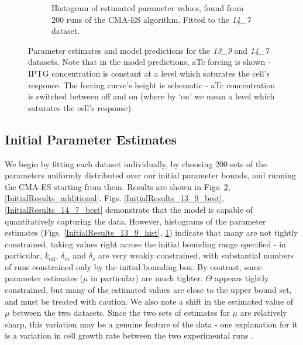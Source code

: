 \documentclass[10pt,journal]{./IEEE_latex_class/IEEEtran}
\begin{document}
\begin{figure}
\begin{subfigure}[c]{0.49\textwidth}
        \caption{Histogram of estimated parameter values, found from 200 runs of the CMA-ES algorithm. Fitted to the \textit{14\_7} dataset. }
        \label{InitialResults_14_7_hist}
    \end{subfigure}
    \caption{Parameter estimates and model predictions for the \textit{13\_9} and \textit{14\_7} datasets. Note that in the model predictions, aTc forcing is shown - IPTG concentration is constant at a level which saturates the cell's response. The forcing curve's height is schematic - aTc concentration is switched between off and on (where by `on' we mean a level which saturates the cell's response).}
\label{InitialResults}
\end{figure} 
 


\subsection{Initial Parameter Estimates}
\label{Initial Parameter Estimates}


 We begin by fitting each dataset individually, by choosing 200 sets of the parameters uniformly distributed over our initial parameter bounds, and running the CMA-ES starting from them. Results are shown in Figs. \ref{InitialResults}, \ref{InitialResults_additional}. Figs. \ref{InitialResults_13_9_best}, \ref{InitialResults_14_7_best}  demonstrate that the model is capable of quantitatively capturing the data. However, histograms of the parameter estimates (Figs. \ref{InitialResults_13_9_hist}, \ref{InitialResults_14_7_hist}) indicate that many are not tightly constrained, taking values right across the initial bounding range specified - in particular, $k_\mathrm{off}$, $\delta_{m}$ and $\delta_{s}$ are very weakly constrained, with substantial numbers of runs constrained only by the initial bounding box. By contrast, some parameter estimates ($\mu$ in particular) are much tighter. $\Theta$ appears tightly constrained, but many of the estimated values are close to the upper bound set, and must be treated with caution. We also note a shift in the estimated value of $\mu$ between the two datasets. Since the two sets of estimates for $\mu$ are relatively sharp, this variation may be a genuine feature of the data - one explanation for it is a variation in cell growth rate between the two experimental runs \cite{Hu2015}.
\end{document}
